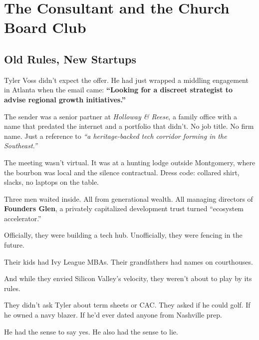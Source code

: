 \section{The Consultant and the Church Board Club}

\subsection{Old Rules, New Startups}

Tyler Voss didn’t expect the offer.  
He had just wrapped a middling engagement in Atlanta when the email came:  
\textbf{``Looking for a discreet strategist to advise regional growth initiatives.''}

The sender was a senior partner at \textit{Holloway \& Reese}, a family office with a name that predated the internet and a portfolio that didn’t.  
No job title. No firm name.  
Just a reference to \textit{``a heritage-backed tech corridor forming in the Southeast.''}

The meeting wasn’t virtual.  
It was at a hunting lodge outside Montgomery, where the bourbon was local and the silence contractual.  
Dress code: collared shirt, slacks, no laptops on the table.

Three men waited inside. All from generational wealth.  
All managing directors of \textbf{Founders Glen}, a privately capitalized development trust turned “ecosystem accelerator.”

Officially, they were building a tech hub.  
Unofficially, they were fencing in the future.

Their kids had Ivy League MBAs.  
Their grandfathers had names on courthouses.

And while they envied Silicon Valley's velocity, they weren’t about to play by its rules.

They didn’t ask Tyler about term sheets or CAC.  
They asked if he could golf. If he owned a navy blazer. If he’d ever dated anyone from Nashville prep.

He had the sense to say yes.  
He also had the sense to lie.

\medskip

